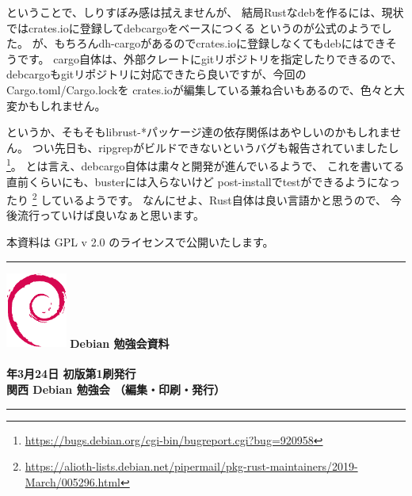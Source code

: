 \documentclass[mingoth,a4paper]{jsarticle}
\newcommand{\debmtgyear}{2019}
\newcommand{\debmtgdate}{24}
\newcommand{\debmtgmonth}{3}
\begin{document}
ということで、しりすぼみ感は拭えませんが、
結局Rustなdebを作るには、現状ではcrates.ioに登録してdebcargoをベースにつくる
というのが公式のようでした。
が、もちろんdh-cargoがあるのでcrates.ioに登録しなくてもdebにはできそうです。
cargo自体は、外部クレートにgitリポジトリを指定したりできるので、
debcargoもgitリポジトリに対応できたら良いですが、今回のCargo.toml/Cargo.lockを
crates.ioが編集している兼ね合いもあるので、色々と大変かもしれません。

というか、そもそもlibrust-*パッケージ達の依存関係はあやしいのかもしれません。
つい先日も、ripgrepがビルドできないというバグも報告されていましたし%
\footnote{\url{https://bugs.debian.org/cgi-bin/bugreport.cgi?bug=920958}}。
とは言え、debcargo自体は粛々と開発が進んでいるようで、
これを書いてる直前くらいにも、busterには入らないけど
post-installでtestができるようになったり%
\footnote{\url{https://alioth-lists.debian.net/pipermail/pkg-rust-maintainers/2019-March/005296.html}}%
しているようです。
なんにせよ、Rust自体は良い言語かと思うので、
今後流行っていけば良いなぁと思います。

\clearpage



\vspace{\fill}
本資料は GPL v 2.0 のライセンスで公開いたします。

\clearpage

%

\mbox{}\newpage
\mbox{}\newpage

\printindex

 \begin{minipage}[b]{0.2\hsize}
 \end{minipage}
 \begin{minipage}[b]{0.8\hsize}

 \vspace*{15cm}
 \rule{\hsize}{1mm}
 \vspace{2mm}
 \includegraphics[width=2cm]{image200502/openlogo-nd.eps}
 \noindent \Large \bfseries{Debian 勉強会資料}\\ \\
 \noindent \normalfont \debmtgyear{}年\debmtgmonth{}月\debmtgdate{}日 \hspace{5mm}  初版第1刷発行\\
 \noindent \normalfont 関西 Debian 勉強会 （編集・印刷・発行）\\
 \rule{\hsize}{1mm}
 \end{minipage}
\end{document}
